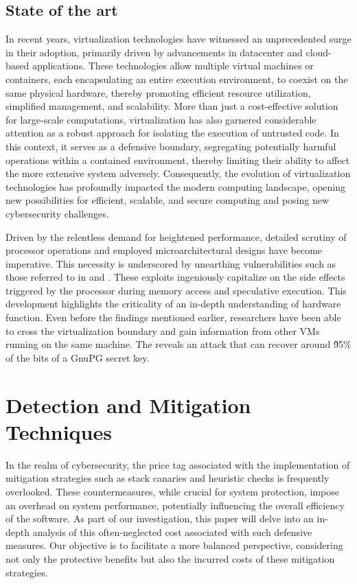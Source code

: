 \documentclass{article}
\begin{document}
\subsection{State of the art}
\begin{comment}
  Rise of the hypervizor exploits (showcase some virtualbox exploits, maybe
  vmware hyperv) RCE Exploits mostly slowing down Common techniques no longer
  being effective (check offbyonesec talk about windows kernel exploitation, talk
  about)
\end{comment}
In recent years, virtualization technologies have witnessed an unprecedented surge in their adoption, primarily driven by advancements in datacenter and cloud-based applications. These technologies allow multiple virtual machines or containers, each encapsulating an entire execution environment, to coexist on the same physical hardware, thereby promoting efficient resource utilization, simplified management, and scalability. More than just a cost-effective solution for large-scale computations, virtualization has also garnered considerable attention as a robust approach for isolating the execution of untrusted code. In this context, it serves as a defensive boundary, segregating potentially harmful operations within a contained environment, thereby limiting their ability to affect the more extensive system adversely. Consequently, the evolution of virtualization technologies has profoundly impacted the modern computing landscape, opening new possibilities for efficient, scalable, and secure computing and posing new cybersecurity challenges.

Driven by the relentless demand for heightened performance, detailed scrutiny of processor operations and employed microarchitectural designs have become imperative. This necessity is underscored by unearthing vulnerabilities such as those referred to in \cite{spectre} and \cite{meltdown}. These exploits ingeniously capitalize on the side effects triggered by the processor during memory access and speculative execution. This development highlights the criticality of an in-depth understanding of hardware function. Even before the findings mentioned earlier, researchers have been able to cross the virtualization boundary and gain information from other VMs running on the same machine. The \cite{flushreload} reveals an attack that can recover around \~95\% of the bits of a GnuPG secret key.

\section{Detection and Mitigation Techniques}%
In the realm of cybersecurity, the price tag associated with the implementation of mitigation strategies such as stack canaries and heuristic checks is frequently overlooked. These countermeasures, while crucial for system protection, impose an overhead on system performance, potentially influencing the overall efficiency of the software. As part of our investigation, this paper will delve into an in-depth analysis of this often-neglected cost associated with such defensive measures. Our objective is to facilitate a more balanced perspective, considering not only the protective benefits but also the incurred costs of these mitigation strategies.
\end{document}
